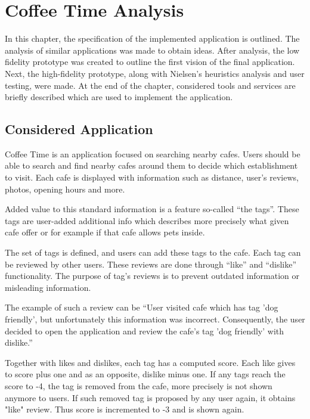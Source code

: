 \chapter{Coffee Time Analysis}
\label{ch:analysis}
In this chapter, the specification of the implemented application is outlined. The analysis of similar applications was made to obtain ideas.  After analysis, the low fidelity prototype was created to outline the first vision of the final application. Next, the high-fidelity prototype, along with Nielsen's heuristics analysis and user testing, were made. At the end of the chapter, considered tools and services are briefly described which are used to implement the application. 
\section{Considered Application}

Coffee Time is an application focused on searching nearby cafes. Users should be able to search and find nearby cafes around them to decide which establishment to visit. Each cafe is displayed with information such as distance, user's reviews, photos, opening hours and more. 

Added value to this standard information is a feature so-called ``the tags''. These tags are user-added additional info which describes more precisely what given cafe offer or for example if that cafe allows pets inside. 

The set of tags is defined, and users can add these tags to the cafe.  Each tag can be reviewed by other users. These reviews are done through ``like'' and ``dislike'' functionality. The purpose of tag's reviews is to prevent outdated information or misleading information.  

The example of such a review can be ``User visited cafe which has tag 'dog friendly', but unfortunately this information was incorrect. Consequently, the user decided to open the application and review the cafe's tag 'dog friendly' with dislike.''

Together with likes and dislikes, each tag has a computed score.  Each like gives to score plus one and as an opposite, dislike minus one. 
If any tags reach the score to -4, the tag is removed from the cafe, more precisely is not shown anymore to users. 
If such removed tag is proposed by any user again, it obtains "like" review. Thus score is incremented to -3 and is shown again. 

